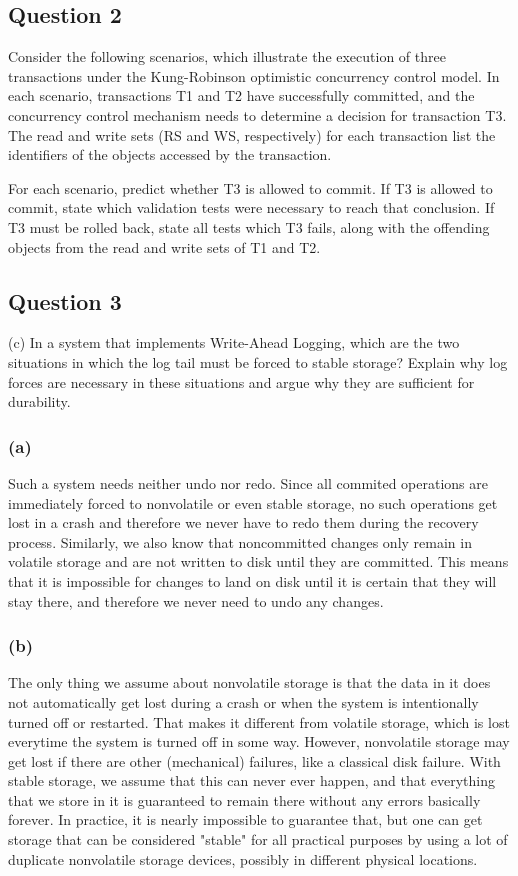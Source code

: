 \documentclass[12pt,a4paper]{article}
\begin{document}
\subsection*{Question 2}
\label{sec:eq2}

Consider the following scenarios, which illustrate the
execution of three transactions under the Kung-Robinson optimistic concurrency control model. In each
scenario, transactions T1 and T2 have successfully committed, and the concurrency control mechanism
needs to determine a decision for transaction T3. The read and write sets (RS and WS, respectively) for
each transaction list the identifiers of the objects accessed by the transaction.

For each scenario, predict whether T3 is allowed to commit. If T3 is allowed to commit, state which
validation tests were necessary to reach that conclusion. If T3 must be rolled back, state all tests which T3
fails, along with the offending objects from the read and write sets of T1 and T2.


\subsection*{Question 3}
\label{sec:eq3}

(c) In a system that implements Write-Ahead Logging, which are the two situations in which the log
tail must be forced to stable storage? Explain why log forces are necessary in these situations and
argue why they are sufficient for durability.

\subsubsection*{(a)}
Such a system needs neither undo nor redo. Since all commited operations are immediately forced to nonvolatile or even stable storage, no such operations get lost in a crash and therefore we never have to redo them during the recovery process. Similarly, we also know that noncommitted changes only remain in volatile storage and are not written to disk until they are committed. This means that it is impossible for changes to land on disk until it is certain that they will stay there, and therefore we never need to undo any changes.

\subsubsection*{(b)}
The only thing we assume about nonvolatile storage is that the data in it does not automatically get lost during a crash or when the system is intentionally turned off or restarted. That makes it different from volatile storage, which is lost everytime the system is turned off in some way. However, nonvolatile storage may get lost if there are other (mechanical) failures, like a classical disk failure. With stable storage, we assume that this can never ever happen, and that everything that we store in it is guaranteed to remain there without any errors basically forever. In practice, it is nearly impossible to guarantee that, but one can get storage that can be considered "stable" for all practical purposes by using a lot of duplicate nonvolatile storage devices, possibly in different physical locations.
\end{document}
